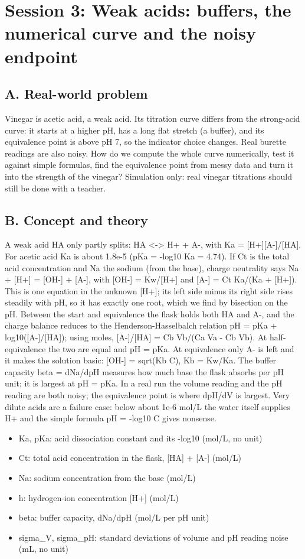 \documentclass[11pt,a4paper]{article}
\begin{document}
\section{Session 3: Weak acids: buffers, the numerical curve and the noisy endpoint}

\subsection*{A. Real-world problem}
Vinegar is acetic acid, a weak acid. Its titration curve differs from the strong-acid curve: it starts at a higher pH, has a long flat stretch (a buffer), and its equivalence point is above pH 7, so the indicator choice changes. Real burette readings are also noisy. How do we compute the whole curve numerically, test it against simple formulas, find the equivalence point from messy data and turn it into the strength of the vinegar? Simulation only: real vinegar titrations should still be done with a teacher.

\subsection*{B. Concept and theory}
A weak acid HA only partly splits: HA \textless{}-\textgreater{} H+ + A-, with Ka = [H+][A-]/[HA]. For acetic acid Ka is about 1.8e-5 (pKa = -log10 Ka = 4.74). If Ct is the total acid concentration and Na the sodium (from the base), charge neutrality says Na + [H+] = [OH-] + [A-], with [OH-] = Kw/[H+] and [A-] = Ct Ka/(Ka + [H+]). This is one equation in the unknown [H+]; its left side minus its right side rises steadily with pH, so it has exactly one root, which we find by bisection on the pH. Between the start and equivalence the flask holds both HA and A-, and the charge balance reduces to the Henderson-Hasselbalch relation pH = pKa + log10([A-]/[HA]); using moles, [A-]/[HA] = Cb Vb/(Ca Va - Cb Vb). At half-equivalence the two are equal and pH = pKa. At equivalence only A- is left and it makes the solution basic: [OH-] = sqrt(Kb C), Kb = Kw/Ka. The buffer capacity beta = dNa/dpH measures how much base the flask absorbs per pH unit; it is largest at pH = pKa. In a real run the volume reading and the pH reading are both noisy; the equivalence point is where dpH/dV is largest. Very dilute acids are a failure case: below about 1e-6 mol/L the water itself supplies H+ and the simple formula pH = -log10 C gives nonsense.

\begin{itemize}[nosep]
\item Ka, pKa: acid dissociation constant and its -log10 (mol/L, no unit)
\item Ct: total acid concentration in the flask, [HA] + [A-] (mol/L)
\item Na: sodium concentration from the base (mol/L)
\item h: hydrogen-ion concentration [H+] (mol/L)
\item beta: buffer capacity, dNa/dpH (mol/L per pH unit)
\item sigma\_V, sigma\_pH: standard deviations of volume and pH reading noise (mL, no unit)
\end{itemize}
\end{document}
